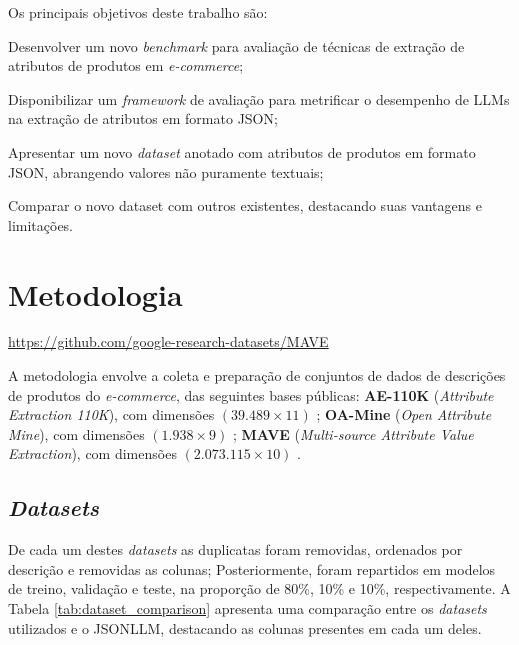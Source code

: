 
Os principais objetivos deste trabalho são:
\begin{enumerate*}
  \item Desenvolver um novo \textit{benchmark} para avaliação de técnicas de extração de atributos de produtos em \textit{e-commerce};
  \item Disponibilizar um \textit{framework} de avaliação para metrificar o desempenho de LLMs na extração de atributos em formato JSON;
  \item Apresentar um novo \textit{dataset} anotado com atributos de produtos em formato JSON, abrangendo valores não puramente textuais;
  \item Comparar o novo dataset com outros existentes, destacando suas vantagens e limitações.
\end{enumerate*}

\section{Metodologia} %

\urldef\maveurl\url{https://github.com/google-research-datasets/MAVE}


A metodologia envolve a coleta e preparação de conjuntos de dados de descrições de produtos do \textit{e-commerce}, das seguintes bases públicas:
\textbf{AE-110K} (\textit{Attribute Extraction 110K}), com dimensões $(39.489 \times 11)$ \cite{ExtractGPT2023, SelfRefinementLLM2025, AliExpress2025, AttriSAGE2024};
\textbf{OA-Mine} (\textit{Open Attribute Mine}), com dimensões $(1.938 \times 9)$ \cite{ExtractGPT2023, SelfRefinementLLM2025};
\textbf{MAVE} (\textit{Multi-source Attribute Value Extraction}), com dimensões $(2.073.115 \times 10)$ \cite{MAVE2024}.

\subsection{\textit{Datasets}}

De cada um destes \textit{datasets} as duplicatas foram removidas, ordenados por descrição e removidas as colunas; Posteriormente, foram repartidos em modelos de treino, validação e teste, na proporção de 80\%, 10\% e 10\%, respectivamente. A Tabela \ref{tab:dataset_comparison} apresenta uma comparação entre os \textit{datasets} utilizados e o JSONLLM, destacando as colunas presentes em cada um deles.

